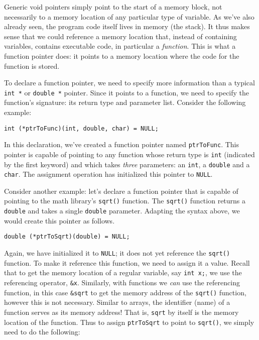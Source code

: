 Generic void pointers simply point to the start of a memory block, not 
necessarily to a memory location of any particular type of variable.  As
we've also already seen, the program code itself lives in memory (the
stack).  It thus makes sense that we could reference a memory location
that, instead of containing variables, contains executable code, in 
particular a \emph{function}.  This is what a function pointer does:
it points to a memory location where the code for the function is
stored.

To declare a function pointer, we need to specify more information than a
typical \texttt{int *} or \texttt{double *} pointer.  Since
it points to a function, we need to specify the function's signature: its
return type and parameter list.  Consider the following example:

\texttt{int (*ptrToFunc)(int, double, char) = NULL;}

In this declaration, we've created a function pointer named \texttt{ptrToFunc}.
This pointer is capable of pointing to any function whose return type is
\texttt{int} (indicated by the first keyword) and which takes 
\emph{three} parameters: an \texttt{int}, a \texttt{double} 
and a \texttt{char}.  The assignment operation has initialized this
pointer to \texttt{NULL}.

Consider another example: let's declare a function pointer that is capable
of pointing to the math library's \texttt{sqrt()} function.  The
\texttt{sqrt()} function returns a \texttt{double} and takes
a single \texttt{double} parameter.  Adapting the syntax above, 
we would create this pointer as follows.

\texttt{double (*ptrToSqrt)(double) = NULL;}

Again, we have initialized it to \texttt{NULL}; it does not yet
reference the \texttt{sqrt()} function.  To make it reference this
function, we need to assign it a value.  Recall that to get the memory
location of a regular variable, say \texttt{int x;}, we use the
referencing operator, \texttt{&x}.  Similarly, with functions we
\emph{can} use the referencing function, in this case \texttt{&sqrt}
to get the memory address of the \texttt{sqrt()} function, however
this is not necessary.  Similar to arrays, the identifier (name) of a
function serves as its memory address!  That is, \texttt{sqrt} by
itself is the memory location of the function.  Thus to assign 
\texttt{ptrToSqrt} to point to \texttt{sqrt()}, we simply
need to do the following:

